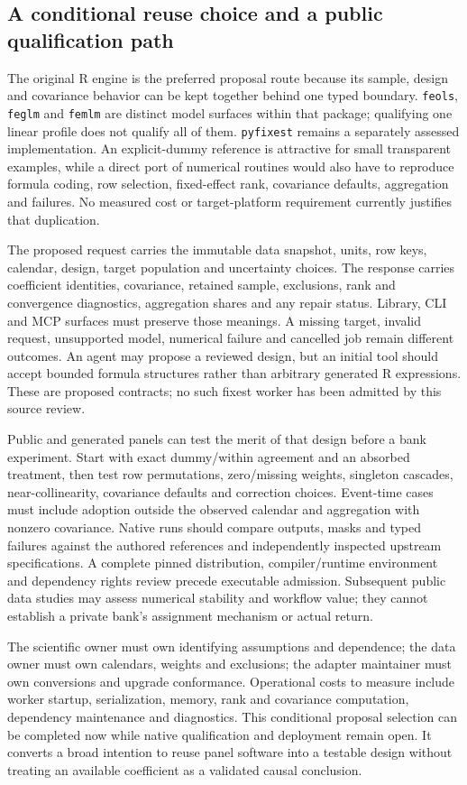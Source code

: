 \subsection{A conditional reuse choice and a public qualification path}
\label{exec20:fx-choice}
The original R engine is the preferred proposal route because its sample,
design and covariance behavior can be kept together behind one typed boundary.
\texttt{feols}, \texttt{feglm} and \texttt{femlm} are distinct model surfaces
within that package; qualifying one linear profile does not qualify all of
them. \texttt{pyfixest} remains a separately assessed implementation.
An explicit-dummy reference is attractive for small transparent examples,
while a direct port of numerical routines would also have to reproduce
formula coding, row selection, fixed-effect rank, covariance defaults,
aggregation and failures. No measured cost or target-platform requirement
currently justifies that duplication.~\citep{exec20_fixest_source,exec20_fixest_reference}

The proposed request carries the immutable data snapshot, units, row keys,
calendar, design, target population and uncertainty choices. The response
carries coefficient identities, covariance, retained sample, exclusions,
rank and convergence diagnostics, aggregation shares and any repair status.
Library, CLI and MCP surfaces must preserve those meanings. A missing target,
invalid request, unsupported model, numerical failure and cancelled job
remain different outcomes. An agent may propose a reviewed design, but an
initial tool should accept bounded formula structures rather than arbitrary
generated R expressions. These are proposed contracts; no such fixest worker
has been admitted by this source review.

Public and generated panels can test the merit of that design before a bank
experiment. Start with exact dummy/within agreement and an absorbed treatment,
then test row permutations, zero/missing weights, singleton cascades,
near-collinearity, covariance defaults and correction choices. Event-time
cases must include adoption outside the observed calendar and aggregation
with nonzero covariance. Native runs should compare outputs, masks and typed
failures against the authored references and independently inspected upstream
specifications. A complete pinned distribution, compiler/runtime environment
and dependency rights review precede executable admission. Subsequent public
data studies may assess numerical stability and workflow value; they cannot
establish a private bank's assignment mechanism or actual return.

The scientific owner must own identifying assumptions and dependence; the
data owner must own calendars, weights and exclusions; the adapter maintainer
must own conversions and upgrade conformance. Operational costs to measure
include worker startup, serialization, memory, rank and covariance computation,
dependency maintenance and diagnostics. This conditional proposal selection
can be completed now while native qualification and deployment remain open.
It converts a broad intention to reuse panel software into a testable design
without treating an available coefficient as a validated causal conclusion.
